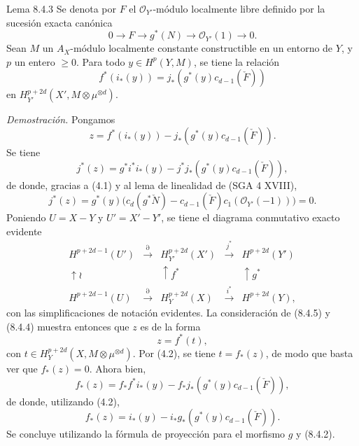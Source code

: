 \begin{statement}{Lema 8.4.3}
Se denota por $F$ el $\mathcal O_{Y'}$-módulo localmente libre definido por la sucesión exacta canónica
\[
0\to F\to g^*(N)\to\mathcal O_{Y'}(1)\to0.
\]
Sean $M$ un $A_X$-módulo localmente constante constructible en un entorno de $Y$, y $p$ un entero $\ge0$. Para todo $y\in H^p(Y,M)$, se tiene la relación
\[
f^*(i_*(y))=j_*(g^*(y)c_{d-1}(\check F))
\]
en $H_{Y'}^{p+2d}(X',M\otimes\mu^{\otimes d})$.
\end{statement}

\emph{Demostración.} Pongamos
\[
z=f^*(i_*(y))-j_*(g^*(y)c_{d-1}(\check F)).
\]
Se tiene
\[
j^*(z)=g^*i^*i_*(y)-j^*j_*(g^*(y)c_{d-1}(\check F)),
\]
de donde, gracias a (4.1) y al lema de linealidad de (SGA 4 XVIII),
\[
j^*(z)=g^*(y)\bigl(c_d(g^*\check N)-c_{d-1}(\check F)c_1(\mathcal O_{Y'}(-1))\bigr)=0.
\tag{8.4.4}
\]
Poniendo $U=X-Y$ y $U'=X'-Y'$, se tiene el diagrama conmutativo exacto evidente
\[
\begin{array}{ccccc}
H^{p+2d-1}(U')&\xrightarrow{\partial}&H^{p+2d}_{Y'}(X')&\xrightarrow{j^*}&H^{p+2d}(Y')\\
\uparrow\wr&&\uparrow f^*&&\uparrow g^*\\
H^{p+2d-1}(U)&\xrightarrow{\partial}&H_Y^{p+2d}(X)&\xrightarrow{i^*}&H^{p+2d}(Y),
\end{array}
\tag{8.4.5}
\]
con las simplificaciones de notación evidentes. La consideración de (8.4.5) y (8.4.4) muestra entonces que $z$ es de la forma
\[
z=f^*(t),
\]
con $t\in H_Y^{p+2d}(X,M\otimes\mu^{\otimes d})$. Por (4.2), se tiene $t=f_*(z)$, de modo que basta ver que $f_*(z)=0$. Ahora bien,
\[
f_*(z)=f_*f^*i_*(y)-f_*j_*(g^*(y)c_{d-1}(\check F)),
\]
de donde, utilizando (4.2),
\[
f_*(z)=i_*(y)-i_*g_*(g^*(y)c_{d-1}(\check F)).
\]
Se concluye utilizando la fórmula de proyección para el morfismo $g$ y (8.4.2).
